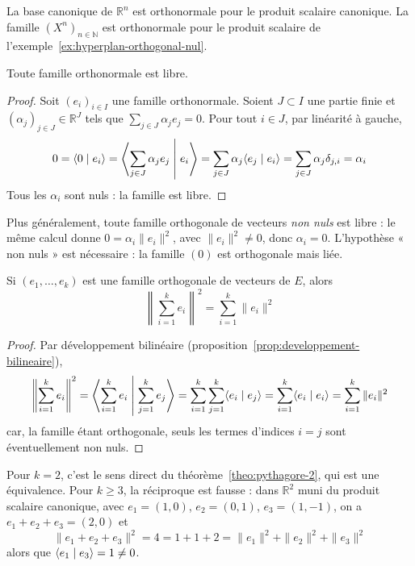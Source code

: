 \begin{exemple}
La base canonique de $\mathbb{R}^n$ est orthonormale pour le produit scalaire canonique. La famille $(X^n)_{n\in\mathbb{N}}$ est orthonormale pour le produit scalaire de l'exemple~\ref{ex:hyperplan-orthogonal-nul}.
\end{exemple}

\begin{prop}
\label{prop:orthonormale-libre}
Toute famille orthonormale est libre.
\end{prop}

\begin{proof}
Soit $(e_i)_{i\in I}$ une famille orthonormale. Soient $J\subset I$ une partie finie et $(\alpha_j)_{j\in J}\in\mathbb{R}^J$ tels que $\sum_{j\in J}\alpha_je_j=0$. Pour tout $i\in J$, par linéarité à gauche,
\[0=\langle 0\mid e_i\rangle=\left\langle \sum_{j\in J}\alpha_je_j\;\middle|\;e_i\right\rangle=\sum_{j\in J}\alpha_j\langle e_j\mid e_i\rangle=\sum_{j\in J}\alpha_j\delta_{j,i}=\alpha_i\]
Tous les $\alpha_i$ sont nuls : la famille est libre.
\end{proof}

\begin{remarque}
Plus généralement, toute famille orthogonale de vecteurs \emph{non nuls} est libre : le même calcul donne $0=\alpha_i\|e_i\|^2$, avec $\|e_i\|^2\neq 0$, donc $\alpha_i=0$. L'hypothèse « non nuls » est nécessaire : la famille $(0)$ est orthogonale mais liée.
\end{remarque}

\begin{theo}
\label{theo:pythagore}
Si $(e_1,\dots,e_k)$ est une famille orthogonale de vecteurs de $E$, alors
\[\left\|\sum_{i=1}^ke_i\right\|^2=\sum_{i=1}^k\|e_i\|^2\]
\end{theo}

\begin{proof}
Par développement bilinéaire (proposition~\ref{prop:developpement-bilineaire}),
\[\left\|\sum_{i=1}^ke_i\right\|^2=\left\langle \sum_{i=1}^ke_i\;\middle|\;\sum_{j=1}^ke_j\right\rangle=\sum_{i=1}^k\sum_{j=1}^k\langle e_i\mid e_j\rangle=\sum_{i=1}^k\langle e_i\mid e_i\rangle=\sum_{i=1}^k\|e_i\|^2\]
car, la famille étant orthogonale, seuls les termes d'indices $i=j$ sont éventuellement non nuls.
\end{proof}

\begin{remarque}
Pour $k=2$, c'est le sens direct du théorème~\ref{theo:pythagore-2}, qui est une équivalence. Pour $k\geq 3$, la réciproque est fausse : dans $\mathbb{R}^2$ muni du produit scalaire canonique, avec $e_1=(1,0)$, $e_2=(0,1)$, $e_3=(1,-1)$, on a $e_1+e_2+e_3=(2,0)$ et
\[\|e_1+e_2+e_3\|^2=4=1+1+2=\|e_1\|^2+\|e_2\|^2+\|e_3\|^2\]
alors que $\langle e_1\mid e_3\rangle=1\neq 0$.
\end{remarque}
